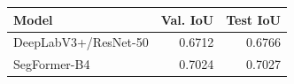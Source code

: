 \begin{tabular}{@{}lrr@{}}
\toprule
Model & Val. IoU & Test IoU \\
\midrule
DeepLabV3+/ResNet-50 & 0.6712 & 0.6766 \\
SegFormer-B4 & 0.7024 & 0.7027 \\
\bottomrule
\end{tabular}

